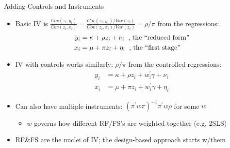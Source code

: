 \documentclass[11pt,english]{beamer}
\begin{document}
\begin{frame}{Adding Controls and Instruments}

\begin{itemize}
\item Basic IV is $\frac{Cov(z_i,y_i)}{Cov(z_i,x_i)}=\frac{Cov(z_i,y_i)/Var(z_i)}{Cov(z_i,x_i)/Var(z_i)}=\rho/\pi$ from the regressions:
\begin{align*}
y_i &= \kappa + \rho z_i + \nu_i \hspace{0.2cm}\text{, the ``reduced form''}\\
x_i &= \mu + \pi z_i + \eta_i\hspace{0.2cm}\text{, the ``first stage'' }
\end{align*}\pause{}\vspace{-0.3cm}

\item IV with controls works similarly: $\rho/\pi$ from the controlled regressions:
\begin{align*}
y_i &= \kappa + \rho z_i + w_i^\prime\gamma + \nu_i \\
x_i &= \mu + \pi z_i + w_i^\prime \gamma + \eta_i
\end{align*}\pause{}\vspace{-0.3cm}

\item Can also have multiple instruments: $(\pi^\prime w \pi)^{-1}\pi^\prime w \rho$ for some $w$\smallskip
\begin{itemize}
\item $w$ governs how different RF/FS's are weighted together (e.g. 2SLS)
\end{itemize}\medskip\pause{}

\item RF\&FS are the nuclei of IV; the design-based approach starts w/them
\end{itemize}

\end{frame}
\end{document}
